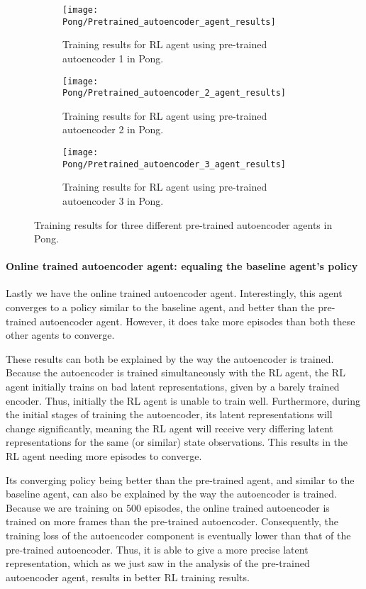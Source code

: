 \begin{figure}[h]
	\centering
	\begin{subfigure}[b]{0.49\textwidth}
		\texttt{[image: Pong/Pretrained\_autoencoder\_agent\_results]}
		\caption{Training results for RL agent using pre-trained autoencoder 1 in Pong.}
		\label{fig:ae1-results-pong}
	\end{subfigure}
	\begin{subfigure}[b]{0.49\textwidth}
		\texttt{[image: Pong/Pretrained\_autoencoder\_2\_agent\_results]}
		\caption{Training results for RL agent using pre-trained autoencoder 2 in Pong.}
		\label{fig:ae2-results-pong}
	\medskip
	\end{subfigure}
	\begin{subfigure}[b]{0.49\textwidth}
		\texttt{[image: Pong/Pretrained\_autoencoder\_3\_agent\_results]}
		\caption{Training results for RL agent using pre-trained autoencoder 3 in Pong.}
		\label{fig:ae3-results-pong}
	\end{subfigure}
	\caption{Training results for three different pre-trained autoencoder agents in Pong.}
	\label{fig:ae-results-pong}
\end{figure}

\clearpage
\paragraph{Online trained autoencoder agent: equaling the baseline agent's policy}
Lastly we have the online trained autoencoder agent. Interestingly, this agent converges to a policy similar to the baseline agent, and better than the pre-trained autoencoder agent. However, it does take more episodes than both these other agents to converge.

These results can both be explained by the way the autoencoder is trained. Because the autoencoder is trained simultaneously with the RL agent, the RL agent initially trains on bad latent representations, given by a barely trained encoder. Thus, initially the RL agent is unable to train well. Furthermore, during the initial stages of training the autoencoder, its latent representations will change significantly, meaning the RL agent will receive very differing latent representations for the same (or similar) state observations. This results in the RL agent needing more episodes to converge.

Its converging policy being better than the pre-trained agent, and similar to the baseline agent, can also be explained by the way the autoencoder is trained. Because we are training on $500$ episodes, the online trained autoencoder is trained on more frames than the pre-trained autoencoder. Consequently, the training loss of the autoencoder component is eventually lower than that of the pre-trained autoencoder. Thus, it is able to give a more precise latent representation, which as we just saw in the analysis of the pre-trained autoencoder agent, results in better RL training results.

